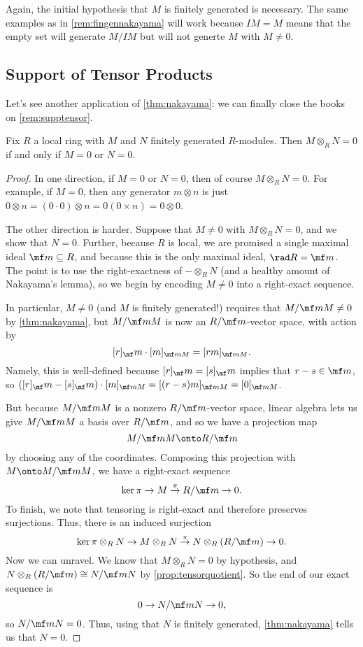 \begin{remark}[Nir]
	Again, the initial hypothesis that $M$ is finitely generated is necessary. The same examples as in \autoref{rem:fingennakayama} will work because $IM=M$ means that the empty set will generate $M/IM$ but will not generte $M$ with $M\ne0$.
\end{remark}

\subsection{Support of Tensor Products}
Let's see another application of \autoref{thm:nakayama}: we can finally close the books on \autoref{rem:supptensor}.
\begin{proposition} \label{prop:localtensorintdomain}
	Fix $R$ a local ring with $M$ and $N$ finitely generated $R$-modules. Then $M\otimes_RN=0$ if and only if $M=0$ or $N=0$.
\end{proposition}
\begin{proof}
	In one direction, if $M=0$ or $N=0$, then of course $M\otimes_RN=0$. For example, if $M=0$, then any generator $m\otimes n$ is just $0\otimes n=(0\cdot0)\otimes n=0(0\times n)=0\otimes0$.
	
	The other direction is harder. Suppose that $M\ne0$ with $M\otimes_RN=0$, and we show that $N=0$. Further, because $R$ is local, we are promised a single maximal ideal $\mf m\subseteq R$, and because this is the only maximal ideal, $\rad R=\mf m$. The point is to use the right-exactness of $-\otimes_RN$ (and a healthy amount of Nakayama's lemma), so we begin by encoding $M\ne0$ into a right-exact sequence.
	
	In particular, $M\ne0$ (and $M$ is finitely generated!) requires that $M/\mf mM\ne0$ by \autoref{thm:nakayama}, but $M/\mf mM$ is now an $R/\mf m$-vector space, with action by
	\[[r]_\mf m\cdot[m]_{\mf mM}=[rm]_{\mf mM}.\]
	Namely, this is well-defined because $[r]_\mf m=[s]_\mf m$ implies that $r-s\in\mf m$, so $([r]_\mf m-[s]_\mf m)\cdot[m]_{\mf mM}=[(r-s)m]_{\mf mM}=[0]_{\mf mM}$.

	But because $M/\mf mM$ is a nonzero $R/\mf m$-vector space, linear algebra lets us give $M/\mf mM$ a basis over $R/\mf m$, and so we have a projection map
	\[M/\mf mM\onto R/\mf m\]
	by choosing any of the coordinates. Composing this projection with $M\onto M/\mf mM$, we have a right-exact sequence
	\[\ker\pi\to M\stackrel{\pi}\to R/\mf m\to0.\]
	To finish, we note that tensoring is right-exact and therefore preserves surjections. Thus, there is an induced surjection
	\[\ker\pi\otimes_RN\to M\otimes_RN\stackrel\pi\to N\otimes_R(R/\mf m)\to0.\]
	Now we can unravel. We know that $M\otimes_RN=0$ by hypothesis, and $N\otimes_R(R/\mf m)\cong N/\mf mN$ by \autoref{prop:tensorquotient}. So the end of our exact sequence is
	\[0\to N/\mf mN\to 0,\]
	so $N/\mf mN=0$. Thus, using that $N$ is finitely generated, \autoref{thm:nakayama} tells us that $N=0$.
\end{proof}
